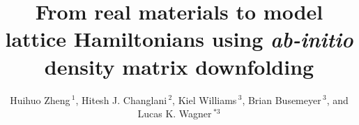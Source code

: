 \documentclass[utf8,latin9]{frontiersFPHY}
\renewcommand\abstractname{}
\def\firstAuthorLast{H. Zheng et al.} %
\def\Authors{Huihuo Zheng\,$^{1}$, Hitesh J. Changlani\,$^{2}$, Kiel Williams\,$^{3}$, Brian Busemeyer\,$^{3}$, and Lucas K. Wagner\,$^{*3}$}
\begin{document}
\onecolumn
{}

\title[Ab initio density matrix downfolding]{From real materials to model lattice Hamiltonians using \textit{ab-initio} density matrix downfolding}
\author[\firstAuthorLast ]{\Authors} %
\address{} %
\correspondance{} %
\extraAuth{}
\maketitle
\end{document}
